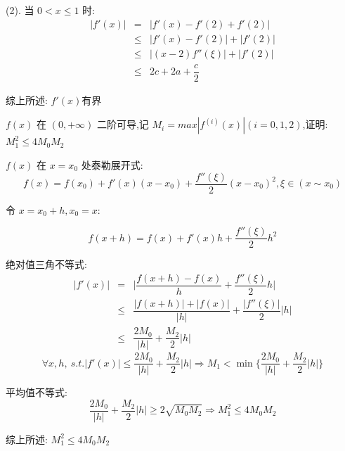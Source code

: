 \begin{solution}
	(2). 当 $0<x\leq 1$ 时:
	\begin{eqnarray*}
		|f'(x)|  &   =  & |f'(x) - f'(2) + f'(2)|\\
				 & \leq & |f'(x)-f'(2)| + |f'(2)|\\
				 & \leq & |(x-2)f''(\xi)| + |f'(2)|\\
				 & \leq & 2c + 2a + \dfrac{c}{2}
	\end{eqnarray*}

	综上所述: $f'(x)$有界
\end{solution}

\begin{proposition}
	$f(x)$ 在 $(0,+\infty)$ 二阶可导,记 $M_{i}=max|f^{(i)}(x)|(i=0,1,2)$,证明: $M_{1}^2\leq 4M_{0}M_{2}$
\end{proposition}
\begin{solution}

	$f(x)$ 在 $x = x_{0}$ 处泰勒展开式:
	$$f(x) = f(x_{0}) + f'(x)(x-x_{0}) + \dfrac{f''(\xi)}{2}(x-x_{0})^{2}, \xi\in(x\sim x_{0})$$

	令 $x = x_{0} + h, x_{0} = x$:

	$$f(x+h) = f(x) + f'(x)h + \dfrac{f''(\xi)}{2}h^2$$

	绝对值三角不等式:
	\begin{eqnarray*}
		|f'(x)| &   =  & \big|\dfrac{f(x+h)-f(x)}{h} + \dfrac{f''(\xi)}{2}h\big|\\
				& \leq & \dfrac{|f(x+h)|+|f(x)|}{|h|} + \dfrac{|f''(\xi)|}{2}|h|\\
				& \leq & \dfrac{2M_{0}}{|h|} + \dfrac{M_{2}}{2}|h|
	\end{eqnarray*}
	$$\forall x,h,\ s.t. |f'(x)| \leq \dfrac{2M_{0}}{|h|} + \dfrac{M_{2}}{2}|h|\Rightarrow M_{1} < \min\{\dfrac{2M_{0}}{|h|} + \dfrac{M_{2}}{2}|h|\}$$
	
	平均值不等式:
	$$\dfrac{2M_{0}}{|h|} + \dfrac{M_{2}}{2}|h| \geq 2 \sqrt{M_{0}M_{2}}\Rightarrow M_{1}^{2} \leq 4M_{0}M_{2}$$
	

	综上所述: $M_{1}^2\leq 4M_{0}M_{2}$
\end{solution}

